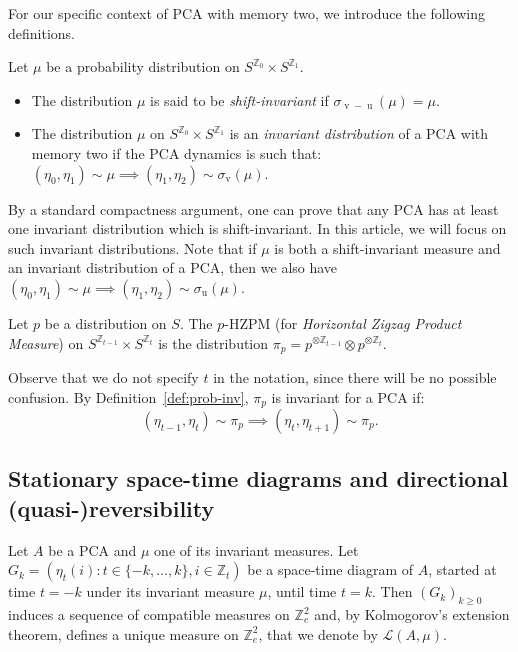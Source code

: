 \documentclass[AHL,Unicode,longabstracts]{cedram}
\newcounter{a}
\newcommand{\ZZ}{\mathbb{Z}}
\newcommand{\Z}{\mathbb{Z}}
\renewcommand{\L}{\mathcal{L}}
\DeclareMathOperator{\vu}{u}
\DeclareMathOperator{\vv}{v}
\begin{document}
For our specific context of PCA with memory two, we introduce the following definitions.

\begin{definition}\label{def:prob-inv}
Let $\mu$ be a probability distribution on $S^{\Z_{0}}\times S^{\Z_{1}}$.
\begin{itemize}
\item The distribution $\mu$ is said to be \emph{shift-invariant} if $\sigma_{\vv-\vu}(\mu)=\mu$.

\item The distribution $\mu$ on $S^{\Z_{0}}\times S^{\Z_{1}}$ is an \emph{invariant distribution} of a PCA with memory two if the PCA dynamics is such that: $(\eta_{0},\eta_{1}) \sim \mu \implies (\eta_{1},\eta_{2}) \sim \sigma_{\vv}(\mu).$

\end{itemize}
\end{definition}

By a standard compactness argument, one can prove that any PCA has at least one invariant distribution which is shift-invariant. In this article, we will focus on such invariant distributions. Note that if $\mu$ is both a shift-invariant measure and an invariant distribution of a PCA, then we also have $(\eta_{0},\eta_{1}) \sim \mu \implies (\eta_{1},\eta_{2}) \sim \sigma_{\vu}(\mu).$

\begin{defi}
Let $p$ be a distribution on $S$. The $p$-HZPM (for \emph{Horizontal Zigzag Product Measure}) on $S^{\Z_{t-1}}\times S^{\Z_{t}}$ is the distribution $\pi_p=p^{\otimes\Z_{t-1}}\otimes p^{\otimes\Z_t}$.
\end{defi}

Observe that we do not specify $t$ in the notation, since there will be no possible confusion. By Definition~\ref{def:prob-inv}, $\pi_p$ is invariant for a PCA if:
\[
(\eta_{t-1},\eta_t) \sim \pi_p \implies (\eta_{t},\eta_{t+1}) \sim \pi_p.
\]

\subsection{Stationary space-time diagrams and directional (quasi-)reversibility}\label{ssec:sstd}

Let $A$ be a PCA and $\mu$ one of its invariant measures. Let $G_k = (\eta_t(i) : t \in \{-k,\dots,k\}, i \in \ZZ_t)$ be a space-time diagram of $A$, started at time $t=-k$ under its invariant measure $\mu$, until time $t=k$. Then $(G_k)_{k\geq 0}$ induces a sequence of compatible measures on $\Z_{e}^2$ and, by Kolmogorov's extension theorem, defines a unique measure on $\Z_{e}^2$, that we denote by $\L(A,\mu)$.
\end{document}
